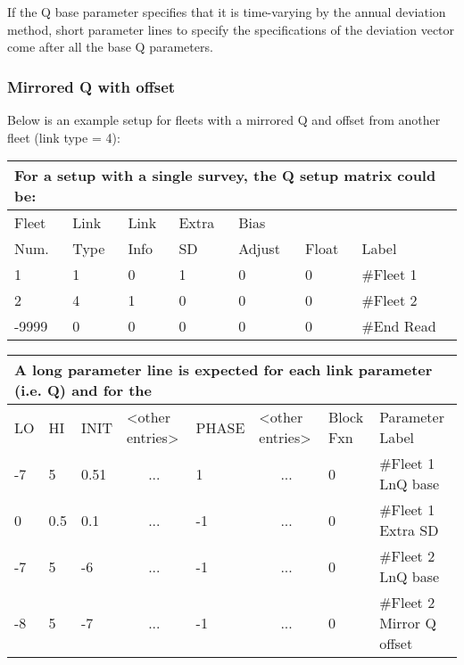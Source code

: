 If the Q base parameter specifies that it is time-varying by the annual deviation method, short parameter lines to specify the specifications of the deviation vector come after all the base Q parameters.

\hypertarget{MirrorQoffset}{}
\subsubsection{Mirrored Q with offset}
Below is an example setup for fleets with a mirrored Q and offset from another fleet (link type = 4):
\begin{longtable}{p{2cm} p{2cm} p{2cm} p{2cm} p{2cm} p{1.3cm} p{2.3cm}}
	\multicolumn{7}{l}{For a setup with a single survey, the Q setup matrix could be:}\\
	\hline
	Fleet \Tstrut & Link & Link & Extra  & Bias   &   & \\
	Num.          & Type & Info & SD     & Adjust & Float  & Label\Bstrut\\
	\hline
	1 & 1 & 0 & 1 & 0 & 0 & \#Fleet 1  \Tstrut\\
	2 & 4 & 1 & 0 & 0 & 0 & \#Fleet 2  \Tstrut\\
	-9999 & 0 & 0 & 0 & 0 & 0 & \#End Read \Bstrut\\
	\hline
\end{longtable}


\begin{longtable}{p{1cm} p{1cm} p{1cm}  p{1.5cm}  p{1.5cm}  p{1.5cm} p{1.75cm}  p{4cm} }
	\multicolumn{8}{l}{A long parameter line is expected for each link parameter (i.e. Q) and for the}\\
	\hline
	LO \Tstrut & HI & INIT & <other entries> &  PHASE & <other entries> & Block Fxn & Parameter Label\Bstrut\\
	\hline
	\endfirsthead
	
	\hline
	\endfoot
	\endlastfoot
	
	-7 & 5   & 0.51 & \multicolumn{1}{c}{...} & 1  & \multicolumn{1}{c}{...} & 0  & \#Fleet 1 LnQ base\Tstrut\\
	0  & 0.5 & 0.1  & \multicolumn{1}{c}{...} & -1 & \multicolumn{1}{c}{...} & 0  & \#Fleet 1 Extra SD\Tstrut\\
	-7 & 5   & -6   & \multicolumn{1}{c}{...} & -1 & \multicolumn{1}{c}{...} & 0  & \#Fleet 2 LnQ base\Bstrut\\
	-8 & 5   & -7   & \multicolumn{1}{c}{...} & -1 & \multicolumn{1}{c}{...} & 0  & \#Fleet 2 Mirror Q  offset\Bstrut\\
	\hline
\end{longtable}

